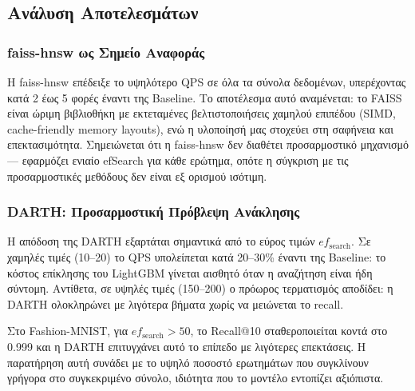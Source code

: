 \documentclass[12pt,a4paper]{article}
\begin{document}
\subsection{Ανάλυση Αποτελεσμάτων}

\subsubsection{faiss-hnsw ως Σημείο Αναφοράς}
Η faiss-hnsw επέδειξε το υψηλότερο QPS σε όλα τα σύνολα δεδομένων, υπερέχοντας κατά 2 έως 5 φορές έναντι της Baseline. Το αποτέλεσμα αυτό αναμένεται: το FAISS \cite{faiss2017} είναι ώριμη βιβλιοθήκη με εκτεταμένες βελτιστοποιήσεις χαμηλού επιπέδου (SIMD, cache-friendly memory layouts), ενώ η υλοποίησή μας στοχεύει στη σαφήνεια και επεκτασιμότητα. Σημειώνεται ότι η faiss-hnsw δεν διαθέτει προσαρμοστικό μηχανισμό --- εφαρμόζει ενιαίο efSearch για κάθε ερώτημα, οπότε η σύγκριση με τις προσαρμοστικές μεθόδους δεν είναι εξ ορισμού ισότιμη.

\subsubsection{DARTH: Προσαρμοστική Πρόβλεψη Ανάκλησης}
Η απόδοση της DARTH εξαρτάται σημαντικά από το εύρος τιμών $ef_{\text{search}}$. Σε χαμηλές τιμές (10--20) το QPS υπολείπεται κατά 20--30\% έναντι της Baseline: το κόστος επίκλησης του LightGBM γίνεται αισθητό όταν η αναζήτηση είναι ήδη σύντομη. Αντίθετα, σε υψηλές τιμές (150--200) ο πρόωρος τερματισμός αποδίδει: η DARTH ολοκληρώνει με λιγότερα βήματα χωρίς να μειώνεται το recall.

Στο Fashion-MNIST, για $ef_{\text{search}} > 50$, το Recall@10 σταθεροποιείται κοντά στο 0.999 και η DARTH επιτυγχάνει αυτό το επίπεδο με λιγότερες επεκτάσεις. Η παρατήρηση αυτή συνάδει με το υψηλό ποσοστό ερωτημάτων που συγκλίνουν γρήγορα στο συγκεκριμένο σύνολο, ιδιότητα που το μοντέλο εντοπίζει αξιόπιστα.
\end{document}
